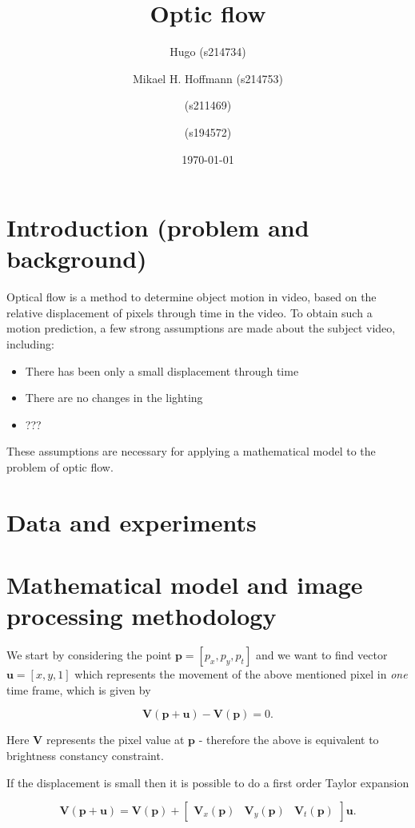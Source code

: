 \documentclass{article}
\title{Optic flow}
\author{Hugo (s214734) \and Mikael H. Hoffmann (s214753) \and (s211469) \and (s194572)}
\date{\today}
\begin{document}
\maketitle

\section{Introduction (problem and background)}
Optical flow is a method to determine object motion in video, based on the relative displacement of pixels
through time in the video. To obtain such a motion prediction, a few strong assumptions are made
about the subject video, including:
\begin{itemize}
    \item There has been only a small displacement through time
    \item There are no changes in the lighting
    \item ???
\end{itemize}
These assumptions are necessary for applying a mathematical model to the problem of optic flow.

\section{Data and experiments}




\section{Mathematical model and image processing methodology}
We start by considering the point $\boldsymbol{p} = [p_x, p_y, p_t]$ and we want to find vector $\boldsymbol{u} = [x, y, 1]$ which represents the movement of the above mentioned pixel in \emph{one} time frame, which is given by

\begin{equation}\label{eq:initial-equation}
    \boldsymbol{V(p + u)} - \boldsymbol{V(p)} = 0.
\end{equation}

Here $\boldsymbol{V}$ represents the pixel value at $\boldsymbol{p}$ - therefore the above is equivalent to brightness constancy constraint. 

If the displacement is small then it is possible to do a first order Taylor expansion

\begin{equation}
    \boldsymbol{V(p + u)} = \boldsymbol{V(p)} + \begin{bmatrix}
        \boldsymbol{V}_x(\boldsymbol{p}) & \boldsymbol{V}_y(\boldsymbol{p}) & \boldsymbol{V}_t(\boldsymbol{p})
    \end{bmatrix} \boldsymbol{u}.
\end{equation}
\end{document}
